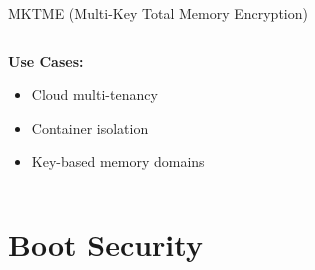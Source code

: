\documentclass[aspectratio=169,12pt]{beamer}
\begin{document}
\begin{frame}{MKTME (Multi-Key Total Memory Encryption)}
\begin{columns}
\begin{column}{0.5\textwidth}
            
            \vspace{0.3cm}
            \textbf{Use Cases:}
            \begin{itemize}
                \item Cloud multi-tenancy
                \item Container isolation
                \item Key-based memory domains
            \end{itemize}
        \end{column}
    \end{columns}
\end{frame}

\section{Boot Security}
\end{document}
